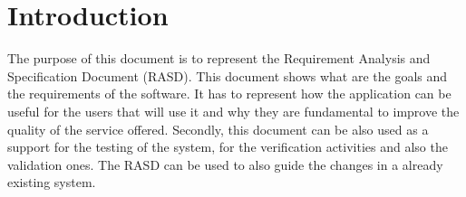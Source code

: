 \chapter{Introduction}
\blindtext
The purpose of this document is to represent the Requirement Analysis and Specification Document (RASD).
This document shows what are the goals and the requirements of the software.
It has to represent how the application can be useful for the users that will use it and why they are fundamental to improve the quality of the service offered. Secondly, this document can be also used as a support for the testing of the system, for the verification activities and also the validation ones. The RASD can be used to also guide the changes in a already existing system.



